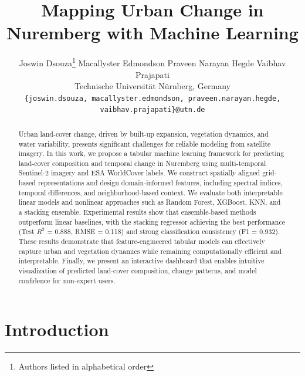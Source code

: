 \documentclass[11pt]{article}
\title{Mapping Urban Change in Nuremberg with Machine Learning}
\author{
  Joswin Dsouza\thanks{Authors listed in alphabetical order} \quad
  Macallyster Edmondson\footnotemark[1] \quad
  Praveen Narayan Hegde\footnotemark[1] \quad
  Vaibhav Prajapati\footnotemark[1] \\
  Technische Universität Nürnberg, Germany \\
  \texttt{\{joswin.dsouza, macallyster.edmondson, praveen.narayan.hegde, vaibhav.prajapati\}@utn.de}
}
\begin{document}
\maketitle
\begin{abstract}
Urban land-cover change, driven by built-up expansion, vegetation dynamics, and water variability, presents significant challenges for reliable modeling from satellite imagery. In this work, we propose a tabular machine learning framework for predicting land-cover composition and temporal change in Nuremberg using multi-temporal Sentinel-2 imagery and ESA WorldCover labels. We construct spatially aligned grid-based representations and design domain-informed features, including spectral indices, temporal differences, and neighborhood-based context. We evaluate both interpretable linear models and nonlinear approaches such as Random Forest, XGBoost, KNN, and a stacking ensemble. Experimental results show that ensemble-based methods outperform linear baselines, with the stacking regressor achieving the best performance (Test $R^2$ = 0.888, RMSE = 0.118) and strong classification consistency (F1 = 0.932). These results demonstrate that feature-engineered tabular models can effectively capture urban and vegetation dynamics while remaining computationally efficient and interpretable. Finally, we present an interactive dashboard that enables intuitive visualization of predicted land-cover composition, change patterns, and model confidence for non-expert users.
\end{abstract}

\section{Introduction}
\end{document}

